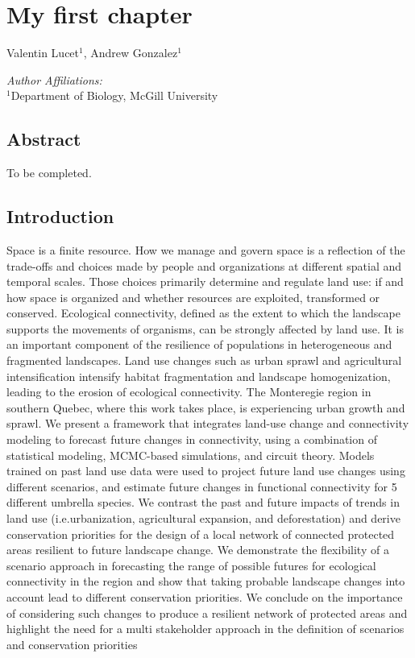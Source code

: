\chapter{My first chapter}
\begin{center}
{Valentin Lucet$^{1}$, Andrew Gonzalez$^{1}$}\\
\end{center}
\textit{Author Affiliations:}\\
\normalsize{$^{1}$Department of Biology, McGill University}\\
\section{Abstract}
To be completed.
\\
\section{Introduction}

Space is a finite resource. How we manage and govern space is a reflection of the trade-offs and choices made by people and organizations at different spatial and temporal scales. Those choices primarily determine and regulate land use: if and how space is organized and whether resources are exploited, transformed or conserved. Ecological connectivity, defined as the extent to which the landscape supports the movements of organisms, can be strongly affected by land use. It is an important component of the resilience of populations in heterogeneous and fragmented landscapes. Land use changes such as urban sprawl and agricultural intensification intensify habitat fragmentation and landscape homogenization, leading to the erosion of ecological connectivity. The Monteregie region in southern Quebec, where this work takes place, is experiencing urban growth and sprawl. We present a framework that integrates land-use change and connectivity modeling to forecast future changes in connectivity, using a combination of statistical modeling, MCMC-based simulations, and circuit theory. Models trained on past land use data were used to project future land use changes using different scenarios, and estimate future changes in functional connectivity for 5 different umbrella species. We contrast the past and future impacts of trends in land use (i.e.urbanization, agricultural expansion, and deforestation) and derive conservation priorities for the design of a local network of connected protected areas resilient to future landscape change. We demonstrate the flexibility of a scenario approach in forecasting the range of possible futures for ecological connectivity in the region and show that taking probable landscape changes into account lead to different conservation priorities. We conclude on the importance of considering such changes to produce a resilient network of protected areas and highlight the need for a multi stakeholder approach in the definition of scenarios and conservation priorities

